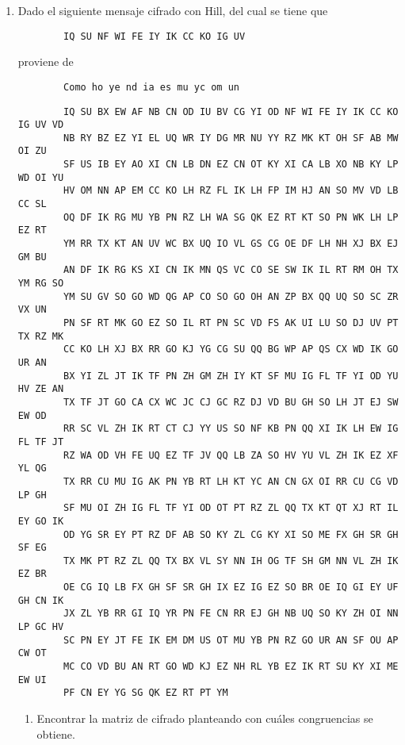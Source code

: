 \documentclass[letterpaper,10pt]{article}
\begin{document}
\begin{enumerate}
\begin{enumerate}
    \end{enumerate}
    
    \item Dado el siguiente mensaje cifrado con Hill, del cual se tiene que 
    \begin{verbatim}
        IQ SU NF WI FE IY IK CC KO IG UV
    \end{verbatim}
    
    proviene de 
    \begin{verbatim}
        Como ho ye nd ia es mu yc om un
    \end{verbatim}
    
    \begin{verbatim}
        IQ SU BX EW AF NB CN OD IU BV CG YI OD NF WI FE IY IK CC KO IG UV VD
        NB RY BZ EZ YI EL UQ WR IY DG MR NU YY RZ MK KT OH SF AB MW OI ZU
        SF US IB EY AO XI CN LB DN EZ CN OT KY XI CA LB XO NB KY LP WD OI YU
        HV OM NN AP EM CC KO LH RZ FL IK LH FP IM HJ AN SO MV VD LB CC SL
        OQ DF IK RG MU YB PN RZ LH WA SG QK EZ RT KT SO PN WK LH LP EZ RT
        YM RR TX KT AN UV WC BX UQ IO VL GS CG OE DF LH NH XJ BX EJ GM BU
        AN DF IK RG KS XI CN IK MN QS VC CO SE SW IK IL RT RM OH TX YM RG SO
        YM SU GV SO GO WD QG AP CO SO GO OH AN ZP BX QQ UQ SO SC ZR VX UN
        PN SF RT MK GO EZ SO IL RT PN SC VD FS AK UI LU SO DJ UV PT TX RZ MK
        CC KO LH XJ BX RR GO KJ YG CG SU QQ BG WP AP QS CX WD IK GO UR AN
        BX YI ZL JT IK TF PN ZH GM ZH IY KT SF MU IG FL TF YI OD YU HV ZE AN
        TX TF JT GO CA CX WC JC CJ GC RZ DJ VD BU GH SO LH JT EJ SW EW OD
        RR SC VL ZH IK RT CT CJ YY US SO NF KB PN QQ XI IK LH EW IG FL TF JT
        RZ WA OD VH FE UQ EZ TF JV QQ LB ZA SO HV YU VL ZH IK EZ XF YL QG
        TX RR CU MU IG AK PN YB RT LH KT YC AN CN GX OI RR CU CG VD LP GH
        SF MU OI ZH IG FL TF YI OD OT PT RZ ZL QQ TX KT QT XJ RT IL EY GO IK
        OD YG SR EY PT RZ DF AB SO KY ZL CG KY XI SO ME FX GH SR GH SF EG
        TX MK PT RZ ZL QQ TX BX VL SY NN IH OG TF SH GM NN VL ZH IK EZ BR
        OE CG IQ LB FX GH SF SR GH IX EZ IG EZ SO BR OE IQ GI EY UF GH CN IK
        JX ZL YB RR GI IQ YR PN FE CN RR EJ GH NB UQ SO KY ZH OI NN LP GC HV
        SC PN EY JT FE IK EM DM US OT MU YB PN RZ GO UR AN SF OU AP CW OT
        MC CO VD BU AN RT GO WD KJ EZ NH RL YB EZ IK RT SU KY XI ME EW UI
        PF CN EY YG SG QK EZ RT PT YM
    \end{verbatim}
    
    \begin{enumerate}
        \item Encontrar la matriz de cifrado planteando con cuáles congruencias
        se obtiene.
        

\end{enumerate}
\end{enumerate}
\end{document}
